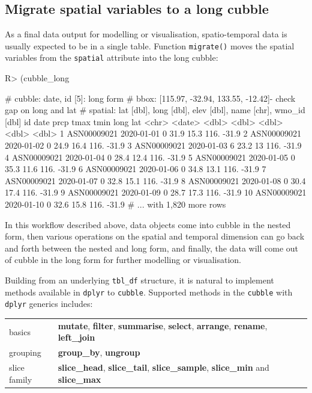 \documentclass[
]{jss}
\begin{document}
\hypertarget{migrate-spatial-variables-to-a-long-cubble}{%
\subsection{Migrate spatial variables to a long
cubble}\label{migrate-spatial-variables-to-a-long-cubble}}

As a final data output for modelling or visualisation, spatio-temporal
data is usually expected to be in a single table. Function
\texttt{migrate()} moves the spatial variables from the \texttt{spatial}
attribute into the long cubble:

\begin{CodeChunk}
\begin{CodeInput}
R> (cubble_long %
\end{CodeInput}
\begin{CodeOutput}
# cubble:  date, id [5]: long form
# bbox:    [115.97, -32.94, 133.55, -12.42]- check gap on long and lat
# spatial: lat [dbl], long [dbl], elev [dbl], name [chr], wmo_id [dbl]
   id          date        prcp  tmax  tmin  long   lat
   <chr>       <date>     <dbl> <dbl> <dbl> <dbl> <dbl>
 1 ASN00009021 2020-01-01     0  31.9  15.3  116. -31.9
 2 ASN00009021 2020-01-02     0  24.9  16.4  116. -31.9
 3 ASN00009021 2020-01-03     6  23.2  13    116. -31.9
 4 ASN00009021 2020-01-04     0  28.4  12.4  116. -31.9
 5 ASN00009021 2020-01-05     0  35.3  11.6  116. -31.9
 6 ASN00009021 2020-01-06     0  34.8  13.1  116. -31.9
 7 ASN00009021 2020-01-07     0  32.8  15.1  116. -31.9
 8 ASN00009021 2020-01-08     0  30.4  17.4  116. -31.9
 9 ASN00009021 2020-01-09     0  28.7  17.3  116. -31.9
10 ASN00009021 2020-01-10     0  32.6  15.8  116. -31.9
# ... with 1,820 more rows
\end{CodeOutput}
\end{CodeChunk}

In this workflow described above, data objects come into cubble in the
nested form, then various operations on the spatial and temporal
dimension can go back and forth between the nested and long form, and
finally, the data will come out of cubble in the long form for further
modelling or visualisation.

Building from an underlying \texttt{tbl\_df} structure, it is natural to
implement methods available in \texttt{dplyr} to \texttt{cubble}.
Supported methods in the \texttt{cubble} with \texttt{dplyr} generics
includes:

\begin{center}
\begin{tabular}{ | m{5em} | m{15cm}| } 
basics & \textbf{mutate}, \textbf{filter}, \textbf{summarise}, \textbf{select}, \textbf{arrange}, \textbf{rename}, \textbf{left\_join} \\
grouping &  \textbf{group\_by}, \textbf{ungroup}\\
slice family & \textbf{slice\_head}, \textbf{slice\_tail}, \textbf{slice\_sample}, \textbf{slice\_min} and \textbf{slice\_max} \\
\end{tabular}
\end{center}
\end{document}
